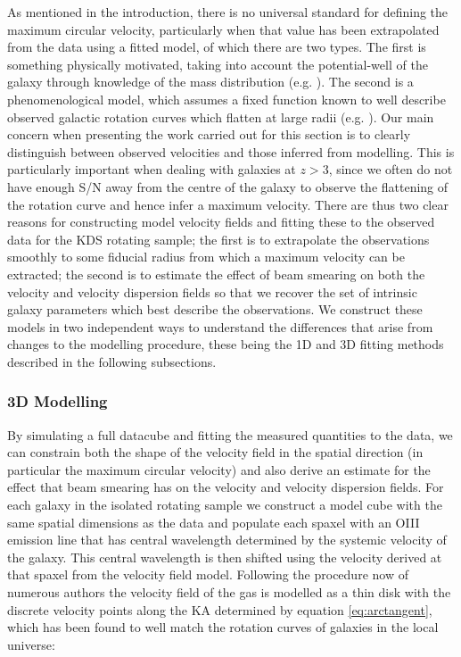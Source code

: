 \documentclass[a4paper,fleqn,usenatbib]{mn2e}
\begin{document}
As mentioned in the introduction, there is no universal standard for defining the maximum circular velocity, particularly when that value has been extrapolated from the data using a fitted model, of which there are two types.
The first is something physically motivated, taking into account the potential-well of the galaxy through knowledge of the mass distribution (e.g. \citep{Gnerucci2011,Wisnioski2015,ForsterSchreiber2009}).
The second is a phenomenological model, which assumes a fixed function known to well describe observed galactic rotation curves which flatten at large radii (e.g. \citep{Stott2016}).
Our main concern when presenting the work carried out for this section is to clearly distinguish between observed velocities and those inferred from modelling.
This is particularly important when dealing with galaxies at $z > 3$, since we often do not have enough S/N away from the centre of the galaxy to observe the flattening of the rotation curve and hence infer a maximum velocity.  
There are thus two clear reasons for constructing model velocity fields and fitting these to the observed data for the KDS rotating sample; the first is to extrapolate the observations smoothly to some fiducial radius from which a maximum velocity can be extracted; the second is to estimate the effect of beam smearing on both the velocity and velocity dispersion fields so that we recover the set of intrinsic galaxy parameters which best describe the observations.
We construct these models in two independent ways to understand the differences that arise from changes to the modelling procedure, these being the 1D and 3D fitting methods described in the following subsections. 


\subsubsection{3D Modelling}\label{subsubsec:3d modelling}
By simulating a full datacube and fitting the measured quantities to the data, we can constrain both the shape of the velocity field in the spatial direction (in particular the maximum circular velocity) and also derive an estimate for the effect that beam smearing has on the velocity and velocity dispersion fields.
For each galaxy in the isolated rotating sample we construct a model cube with the same spatial dimensions as the data and populate each spaxel with an OIII emission line that has central wavelength determined by the systemic velocity of the galaxy.
This central wavelength is then shifted using the velocity derived at that spaxel from the velocity field model.  
Following the procedure now of numerous authors \citep[e.g.]{Swinbank2012,Stott2016,Mason2016} the velocity field of the gas is modelled as a thin disk with the discrete velocity points along the KA determined by equation \ref{eq:arctangent}, which has been found to well match the rotation curves of galaxies in the local universe:
\end{document}
